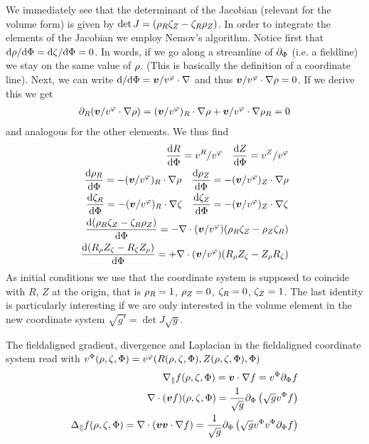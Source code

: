 We immediately see that the determinant of the Jacobian (relevant for the
volume form) is given by $\det J = ({\rho}_R {\zeta}_Z  - {\zeta}_R{\rho}_Z)$.
In order to integrate the elements of the Jacobian we employ Nemov's algorithm.
Notice first that $\mathrm{d} {\rho}/ \mathrm{d}{\Phi} = \mathrm{d} {\zeta} / \mathrm{d}{\Phi}  = 0$.
In words, if we go along a streamline of $\partial_{\Phi}$ (i.e. a fieldline) we
stay on the same value of ${\rho}$. (This is basically the definition of a coordinate line).
Next, we can write $\mathrm{d} / \mathrm{d}{\Phi} = {\boldsymbol{v}} / v^\varphi \cdot \nabla $ and thus
${\boldsymbol{v}} / v^\varphi \cdot \nabla {\rho} = 0$. If we derive this we get
\begin{align}
\partial_R ( {\boldsymbol{v}}/ v^\varphi\cdot\nabla {\rho} ) = ({\boldsymbol{v}}/ v^\varphi)_R \cdot \nabla{\rho} + {\boldsymbol{v}}/ v^\varphi\cdot \nabla {\rho}_R = 0
\end{align}
and analogous for the other elements. We thus find
\begin{align}
\frac{\mathrm{d} R}{\mathrm{d}{\Phi}} = v^R/ v^\varphi \quad
\frac{\mathrm{d} Z}{\mathrm{d}{\Phi}} = v^Z/ v^\varphi \\
\frac{\mathrm{d} {\rho}_R}{\mathrm{d}{\Phi}} = - ({\boldsymbol{v}}/ v^\varphi)_R \cdot \nabla{\rho} \quad
\frac{\mathrm{d} {\rho}_Z}{\mathrm{d}{\Phi}} = - ({\boldsymbol{v}}/ v^\varphi)_Z \cdot \nabla{\rho} \\
\frac{\mathrm{d} {\zeta}_R}{\mathrm{d}{\Phi}} = - ({\boldsymbol{v}}/ v^\varphi)_R \cdot \nabla{\zeta} \quad
\frac{\mathrm{d} {\zeta}_Z}{\mathrm{d}{\Phi}} = - ({\boldsymbol{v}}/ v^\varphi)_Z \cdot \nabla{\zeta}  \\
\frac{\mathrm{d} ({\rho}_R {\zeta}_Z - {\zeta}_R {\rho}_Z)}{\mathrm{d}{\Phi}} = - \nabla\cdot ({\boldsymbol{v}}/ v^\varphi) ( {\rho}_R{\zeta}_Z - {\rho}_Z{\zeta}_R) \\
\frac{\mathrm{d} (R_{\rho} Z_{\zeta} - R_{\zeta} Z_{\rho})}{\mathrm{d}{\Phi}} = + \nabla\cdot ({\boldsymbol{v}}/ v^\varphi) ( R_{\rho} Z_{\zeta} - Z_{\rho} R_{\zeta})
\end{align}
As initial conditions we use that the coordinate system is supposed to coincide with $R$, $Z$
at the origin, that is ${\rho}_R = 1$, ${\rho}_Z = 0$, ${\zeta}_R = 0$, ${\zeta}_Z = 1$.
The last identity is particularly interesting if we are only interested in the volume element in the
new coordinate system $\sqrt{g'} = \det J \sqrt{g}$.

The fieldaligned gradient, divergence and Laplacian in the fieldaligned coordinate system read
with $v^{\Phi}({\rho},{\zeta},{\Phi}) = v^\varphi( R({\rho},{\zeta},{\Phi}), Z({\rho},{\zeta},{\Phi}), {\Phi})$
\begin{align}
\nabla_\parallel f ({\rho},{\zeta},{\Phi}) =  {\boldsymbol{v}} \cdot\nabla f = v^{\Phi} \partial_{\Phi} f \\
\nabla\cdot ({\boldsymbol{v}} f) ({\rho},{\zeta},{\Phi}) =  \frac{1}{\sqrt{g}} \partial_{\Phi}\left(\sqrt{g} v^{\Phi} f \right)\\
\Delta_\parallel f ({\rho},{\zeta},{\Phi}) =  \nabla\cdot ({\boldsymbol{v}}{\boldsymbol{v}}\cdot \nabla f)  = \frac{1}{\sqrt{g}}
    \partial_{\Phi}\left(\sqrt{g} v^{\Phi} v^{\Phi} \partial_{\Phi} f\right)
\end{align}

